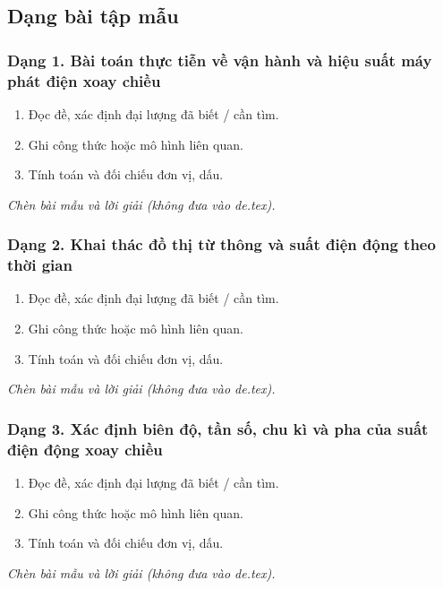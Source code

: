 

\subsection{Dạng bài tập mẫu}
\subsubsection{Dạng 1. Bài toán thực tiễn về vận hành và hiệu suất máy phát điện xoay chiều}
\begin{phuongphap}
\begin{enumerate}
\item Đọc đề, xác định đại lượng đã biết / cần tìm.
\item Ghi công thức hoặc mô hình liên quan.
\item Tính toán và đối chiếu đơn vị, dấu.
\end{enumerate}
\end{phuongphap}
\begin{vidumau}
\textit{Chèn bài mẫu và lời giải (không đưa vào de.tex).}
\end{vidumau}

\subsubsection{Dạng 2. Khai thác đồ thị từ thông và suất điện động theo thời gian}
\begin{phuongphap}
\begin{enumerate}
\item Đọc đề, xác định đại lượng đã biết / cần tìm.
\item Ghi công thức hoặc mô hình liên quan.
\item Tính toán và đối chiếu đơn vị, dấu.
\end{enumerate}
\end{phuongphap}
\begin{vidumau}
\textit{Chèn bài mẫu và lời giải (không đưa vào de.tex).}
\end{vidumau}

\subsubsection{Dạng 3. Xác định biên độ, tần số, chu kì và pha của suất điện động xoay chiều}
\begin{phuongphap}
\begin{enumerate}
\item Đọc đề, xác định đại lượng đã biết / cần tìm.
\item Ghi công thức hoặc mô hình liên quan.
\item Tính toán và đối chiếu đơn vị, dấu.
\end{enumerate}
\end{phuongphap}
\begin{vidumau}
\textit{Chèn bài mẫu và lời giải (không đưa vào de.tex).}
\end{vidumau}

